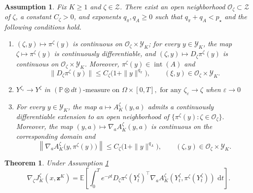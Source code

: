\documentclass[11pt]{article}
\newtheorem{assumption}{Assumption}[section]
\newtheorem{theorem}{Theorem}[section]
\theoremstyle{remarkitalic}
\theoremstyle{remarkitalic}
\newcommand{\E}{\mathbb E}
\newcommand{\dd}{\,\mathrm d}
\newcommand{\1}{\mathbf 1}
\begin{document}
\begin{assumption}
\label{ass:actor-advantage-regularity}
Fix $K \geq 1$ and $\zeta \in \mathcal{Z}$. There exist an open
neighborhood $\mathcal O_\zeta \subset \mathcal{Z}$ of $\zeta$, a constant
$C_{\zeta}>0$, and exponents $q_{\pi},q_A\geq 0$ such that  $q_{\pi}+q_A<p_\star$ and the following
conditions hold.

\begin{enumerate}
    \item 
   $
        (\zeta,y)\longmapsto \pi^{\zeta}(y)
$
    is continuous on $\mathcal O_{\zeta}\times\mathcal{Y}_K$; for every
    $y\in\mathcal{Y}_K$, the map
$
        \zeta\longmapsto \pi^{\zeta}(y)
$
    is continuously differentiable, and
 $  
        (\zeta,y)\longmapsto D_{\zeta}\pi^{\zeta}(y)
$
    is continuous on $\mathcal O_{\zeta}\times\mathcal{Y}_K$. Moreover,
$
        \pi^{\zeta}(y)\in\operatorname{int}(A)
$
    and
    \[
        \bigl\|D_{\zeta}\pi^{\zeta}(y)\bigr\|
        \leq
        C_{\zeta}\bigl(1+\|y\|^{q_{\pi}}\bigr),
        \qquad
        (\xi,y)\in \mathcal O_{\zeta}\times\mathcal{Y}_K.
    \]

    \item 
   
       $ Y^{\zeta_\varepsilon}\longrightarrow Y^{\zeta}$
        in $(\mathbb{P}\otimes dt)\text{-measure on }
        \Omega\times[0,T],
        \text{ for any }\zeta_\varepsilon\longrightarrow\zeta$ when $\varepsilon\longrightarrow 0$  

    \item 
    For every $y\in\mathcal{Y}_K$, the map
        $a\longmapsto A_K^{\zeta}(y,a)$
    admits a continuously differentiable extension to an open
    neighborhood of
      $  \bigl\{\pi^{\zeta}(y):\zeta\in \mathcal O_{\zeta}\bigr\}.
$ Moreover, 
    the map
$
        (y,a)\longmapsto\nabla_a A_K^{\zeta}(y,a)
$
    is continuous on the corresponding domain and 
    \[
        \left\|
        \nabla_a A_K^{\zeta}
        \bigl(y,\pi^{\zeta}(y)\bigr)
        \right\|
        \leq
        C_{\zeta}\bigl(1+\|y\|^{q_A}\bigr),
        \qquad
        (\zeta,y)\in \mathcal O_{\zeta}\times\mathcal{Y}_K.
    \]

\end{enumerate}

\end{assumption}






\begin{theorem}
\label{thm:dpg}
Under Assumption \ref{ass:actor-advantage-regularity}
\[
    \nabla_\zeta J_K^{\zeta}(x,\mathbf{z}^K)
    =
    \E\left[
        \int_0^T e^{-\rho t}
        D_\zeta\pi^\zeta(Y_t^\zeta)^\top
        \nabla_a A_K^\zeta(Y_t^\zeta,\pi^\zeta(Y_t^\zeta))\,\dd t
    \right].
\]
\end{theorem}
\end{document}
